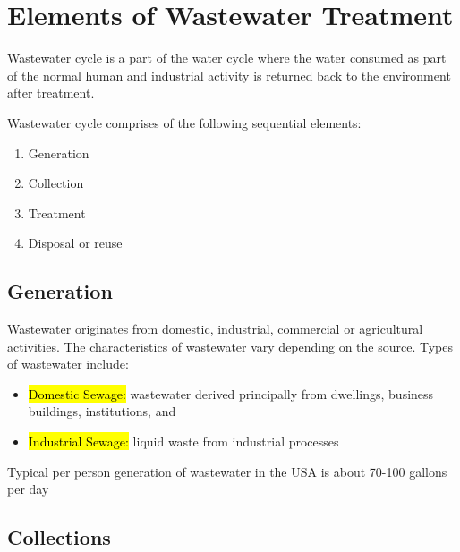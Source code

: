 \chapter{Elements of Wastewater Treatment}

Wastewater cycle is a part of the water cycle where the water consumed as part of the normal human and industrial activity is returned back to the environment after treatment.

Wastewater cycle comprises of the following sequential elements:
\begin{enumerate}
\item Generation
\item Collection
\item Treatment
\item Disposal or reuse
\end{enumerate}

\section{Generation}

Wastewater originates from domestic, industrial, commercial or agricultural activities. The characteristics of wastewater vary depending on the source. Types of wastewater include: 
\begin{itemize}
\item \hl{Domestic Sewage:}  wastewater derived principally from dwellings, business buildings, institutions, and \\
\item \hl{Industrial Sewage:}  liquid waste from industrial processes\\
\end{itemize}
Typical per person generation of wastewater in the USA is about 70-100 gallons per day

\section{Collections}

